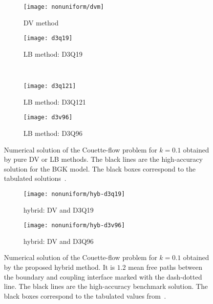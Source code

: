 \documentclass[]{elsarticle} %
\begin{document}
\begin{figure}
    \centering
    \begin{subfigure}[b]{0.5\textwidth}
        \texttt{[image: nonuniform/dvm]}
        \caption{DV method}
        \label{fig:dvm}
    \end{subfigure}%
    \begin{subfigure}[b]{0.5\textwidth}
        \texttt{[image: d3q19]}
        \caption{LB method: D3Q19}
        \label{fig:d3q19}
    \end{subfigure}\\
    \begin{subfigure}[b]{0.5\textwidth}
        \texttt{[image: d3q121]}
        \caption{LB method: D3Q121}
        \label{fig:d3q121}
    \end{subfigure}%
    \begin{subfigure}[b]{0.5\textwidth}
        \texttt{[image: d3v96]}
        \caption{LB method: D3Q96}
        \label{fig:d3q96}
    \end{subfigure}
    \caption{
        Numerical solution of the Couette-flow problem for \(k=0.1\) obtained by pure DV or LB methods.
        The black lines are the high-accuracy solution for the BGK model.
        The black boxes correspond to the tabulated solutions~\cite{Luo2016}.
    }\label{fig:pure}
\end{figure}

\begin{figure}
    \centering
    \begin{subfigure}[b]{0.5\textwidth}
        \texttt{[image: nonuniform/hyb-d3q19]}
        \caption{hybrid: DV and D3Q19}
        \label{fig:hyb:d3q19}
    \end{subfigure}%
    \begin{subfigure}[b]{0.5\textwidth}
        \texttt{[image: nonuniform/hyb-d3v96]}
        \caption{hybrid: DV and D3Q96}
        \label{fig:hyb:d3v96}
    \end{subfigure}
    \caption{
        Numerical solution of the Couette-flow problem for \(k=0.1\) obtained by the proposed hybrid method.
        It is \(1.2\) mean free paths between the boundary and coupling interface marked with the dash-dotted line.
        The black lines are the high-accuracy benchmark solution.
        The black boxes correspond to the tabulated values from~\cite{Luo2016}.
    }\label{fig:hybrid}
\end{figure}
\end{document}
